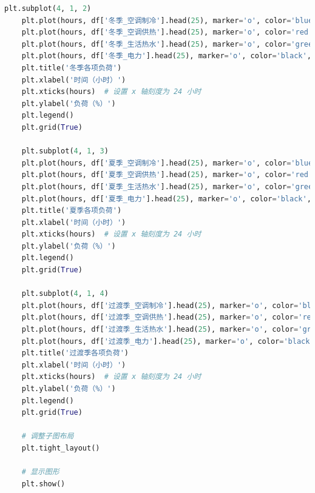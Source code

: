 \documentclass[UTF8]{ctexart}
\begin{document}
\begin{lstlisting}[language=Python]
    plt.subplot(4, 1, 2)
    plt.plot(hours, df['冬季_空调制冷'].head(25), marker='o', color='blue', label='冬季空调制冷')
    plt.plot(hours, df['冬季_空调供热'].head(25), marker='o', color='red', label='冬季空调供热')
    plt.plot(hours, df['冬季_生活热水'].head(25), marker='o', color='green', label='冬季生活热水')
    plt.plot(hours, df['冬季_电力'].head(25), marker='o', color='black', label='冬季电力')
    plt.title('冬季各项负荷')
    plt.xlabel('时间（小时）')
    plt.xticks(hours)  # 设置 x 轴刻度为 24 小时
    plt.ylabel('负荷（%）')
    plt.legend()
    plt.grid(True)

    plt.subplot(4, 1, 3)
    plt.plot(hours, df['夏季_空调制冷'].head(25), marker='o', color='blue', label='夏季空调制冷')
    plt.plot(hours, df['夏季_空调供热'].head(25), marker='o', color='red', label='夏季空调供热')
    plt.plot(hours, df['夏季_生活热水'].head(25), marker='o', color='green', label='夏季生活热水')
    plt.plot(hours, df['夏季_电力'].head(25), marker='o', color='black', label='夏季电力')
    plt.title('夏季各项负荷')
    plt.xlabel('时间（小时）')
    plt.xticks(hours)  # 设置 x 轴刻度为 24 小时
    plt.ylabel('负荷（%）')
    plt.legend()
    plt.grid(True)

    plt.subplot(4, 1, 4)
    plt.plot(hours, df['过渡季_空调制冷'].head(25), marker='o', color='blue', label='过渡季空调制冷')
    plt.plot(hours, df['过渡季_空调供热'].head(25), marker='o', color='red', label='过渡季空调供热')
    plt.plot(hours, df['过渡季_生活热水'].head(25), marker='o', color='green', label='过渡季生活热水')
    plt.plot(hours, df['过渡季_电力'].head(25), marker='o', color='black', label='过渡季电力')
    plt.title('过渡季各项负荷')
    plt.xlabel('时间（小时）')
    plt.xticks(hours)  # 设置 x 轴刻度为 24 小时
    plt.ylabel('负荷（%）')
    plt.legend()
    plt.grid(True)

    # 调整子图布局
    plt.tight_layout()

    # 显示图形
    plt.show()
    \end{lstlisting}
\end{document}
